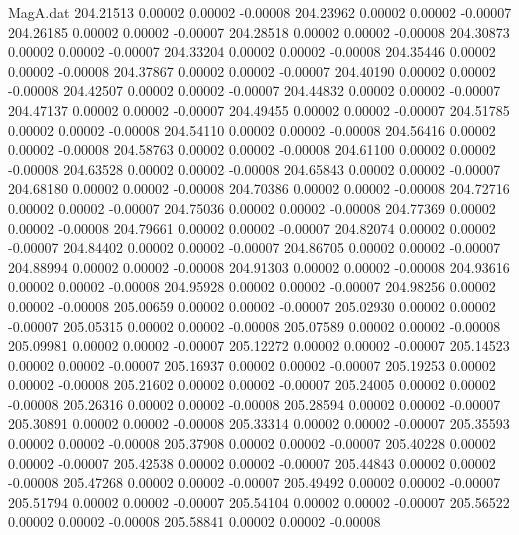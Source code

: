 \begin{filecontents}{MagA.dat}
 204.21513    0.00002    0.00002   -0.00008
 204.23962    0.00002    0.00002   -0.00007
 204.26185    0.00002    0.00002   -0.00007
 204.28518    0.00002    0.00002   -0.00008
 204.30873    0.00002    0.00002   -0.00007
 204.33204    0.00002    0.00002   -0.00008
 204.35446    0.00002    0.00002   -0.00008
 204.37867    0.00002    0.00002   -0.00007
 204.40190    0.00002    0.00002   -0.00008
 204.42507    0.00002    0.00002   -0.00007
 204.44832    0.00002    0.00002   -0.00007
 204.47137    0.00002    0.00002   -0.00007
 204.49455    0.00002    0.00002   -0.00007
 204.51785    0.00002    0.00002   -0.00008
 204.54110    0.00002    0.00002   -0.00008
 204.56416    0.00002    0.00002   -0.00008
 204.58763    0.00002    0.00002   -0.00008
 204.61100    0.00002    0.00002   -0.00008
 204.63528    0.00002    0.00002   -0.00008
 204.65843    0.00002    0.00002   -0.00007
 204.68180    0.00002    0.00002   -0.00008
 204.70386    0.00002    0.00002   -0.00008
 204.72716    0.00002    0.00002   -0.00007
 204.75036    0.00002    0.00002   -0.00008
 204.77369    0.00002    0.00002   -0.00008
 204.79661    0.00002    0.00002   -0.00007
 204.82074    0.00002    0.00002   -0.00007
 204.84402    0.00002    0.00002   -0.00007
 204.86705    0.00002    0.00002   -0.00007
 204.88994    0.00002    0.00002   -0.00008
 204.91303    0.00002    0.00002   -0.00008
 204.93616    0.00002    0.00002   -0.00008
 204.95928    0.00002    0.00002   -0.00007
 204.98256    0.00002    0.00002   -0.00008
 205.00659    0.00002    0.00002   -0.00007
 205.02930    0.00002    0.00002   -0.00007
 205.05315    0.00002    0.00002   -0.00008
 205.07589    0.00002    0.00002   -0.00008
 205.09981    0.00002    0.00002   -0.00007
 205.12272    0.00002    0.00002   -0.00007
 205.14523    0.00002    0.00002   -0.00007
 205.16937    0.00002    0.00002   -0.00007
 205.19253    0.00002    0.00002   -0.00008
 205.21602    0.00002    0.00002   -0.00007
 205.24005    0.00002    0.00002   -0.00008
 205.26316    0.00002    0.00002   -0.00008
 205.28594    0.00002    0.00002   -0.00007
 205.30891    0.00002    0.00002   -0.00008
 205.33314    0.00002    0.00002   -0.00007
 205.35593    0.00002    0.00002   -0.00008
 205.37908    0.00002    0.00002   -0.00007
 205.40228    0.00002    0.00002   -0.00007
 205.42538    0.00002    0.00002   -0.00007
 205.44843    0.00002    0.00002   -0.00008
 205.47268    0.00002    0.00002   -0.00007
 205.49492    0.00002    0.00002   -0.00007
 205.51794    0.00002    0.00002   -0.00007
 205.54104    0.00002    0.00002   -0.00007
 205.56522    0.00002    0.00002   -0.00008
 205.58841    0.00002    0.00002   -0.00008

\end{filecontents}
